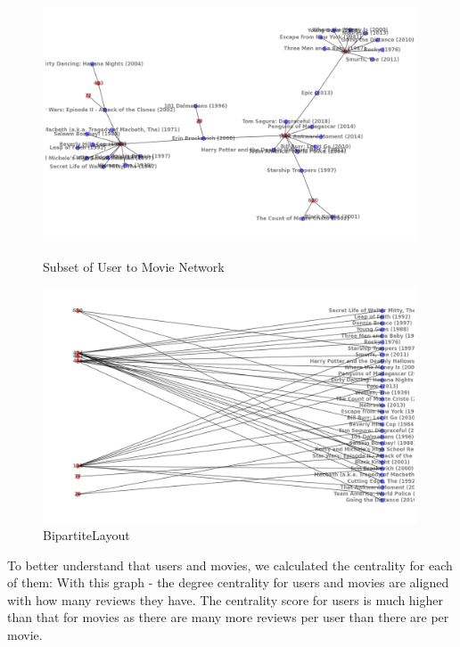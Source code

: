 \documentclass[12pt]{article}
\numberwithin{equation}{section}
\begin{document}
\begin{figure}[h!]
\centering
    \begin{minipage}[b]{0.49\linewidth}
         \centering
  	\includegraphics[width=0.99\textwidth]{sample_graph.png}
  	\caption{Subset of User to Movie Network}
  	\label{fig:count_ranking}
    \end{minipage}
    \hspace{0.01cm}
    \begin{minipage}[b]{0.49\linewidth}
        \centering
  	\includegraphics[width=0.99\textwidth]{bipartite.png}
  	\caption{BipartiteLayout}
  	\label{fig:ranking_ts}
    \end{minipage}
\end{figure}


To better understand that users and movies, we calculated the centrality for each of them:
With this graph - the degree centrality for users and movies are aligned with how many reviews they have. The centrality score for users is much higher than that for movies as there are many more reviews per user than there are per movie. 
\end{document}

